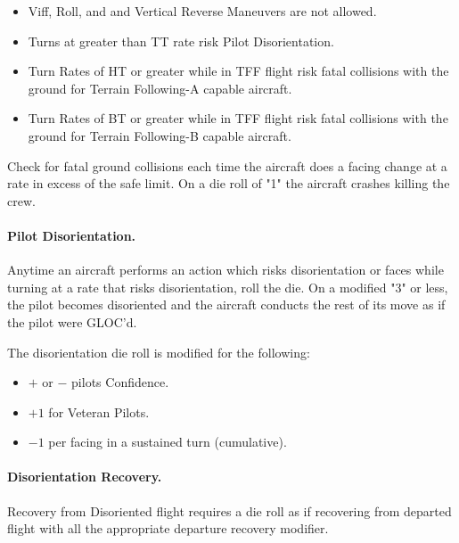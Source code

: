\begin{itemize}

    \item Viff, Roll, and and Vertical Reverse Maneuvers are not allowed.

    \item Turns at greater than TT rate risk Pilot Disorientation.

    \item Turn Rates of HT or greater while in TFF flight risk fatal collisions with the ground for Terrain Following-A capable aircraft.  

    \item Turn Rates of BT or greater while in TFF flight risk fatal collisions with the ground for Terrain Following-B capable aircraft.


\end{itemize}

Check for fatal ground collisions each time the aircraft does a facing change at a rate in excess of the safe limit. On a die roll of "1" the aircraft crashes killing the crew.

\paragraph{Pilot Disorientation.} Anytime an aircraft performs an action which risks disorientation or faces while turning at a rate that risks disorientation, roll the die. On a modified "3" or less, the pilot becomes disoriented and the aircraft conducts the rest of its move as if the pilot were GLOC'd. 

The disorientation die roll is modified for the following:
\begin{itemize}
    \item $+$ or $-$ pilots Confidence.
    \item $+1$ for Veteran Pilots.
    \item $-1$ per facing in a sustained turn (cumulative).
\end{itemize}

\paragraph{Disorientation Recovery.} Recovery from Disoriented flight requires a die roll as if recovering from departed flight with all the appropriate departure recovery modifier.

